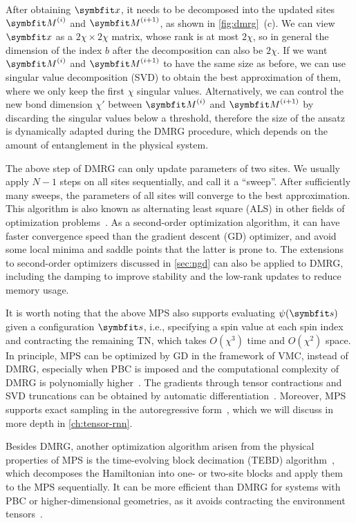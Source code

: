 After obtaining $\vx$, it needs to be decomposed into the updated sites $\mM^{(i)}$ and $\mM^{(i + 1)}$, as shown in \cref{fig:dmrg}~(c). We can view $\vx$ as a $2 \chi \times 2 \chi$ matrix, whose rank is at most $2 \chi$, so in general the dimension of the index $b$ after the decomposition can also be $2 \chi$. If we want $\mM^{(i)}$ and $\mM^{(i + 1)}$ to have the same size as before, we can use singular value decomposition (SVD) to obtain the best approximation of them, where we only keep the first $\chi$ singular values. Alternatively, we can control the new bond dimension $\chi'$ between $\mM^{(i)}$ and $\mM^{(i + 1)}$ by discarding the singular values below a threshold, therefore the size of the ansatz is dynamically adapted during the DMRG procedure, which depends on the amount of entanglement in the physical system.

The above step of DMRG can only update parameters of two sites. We usually apply $N - 1$ steps on all sites sequentially, and call it a ``sweep''. After sufficiently many sweeps, the parameters of all sites will converge to the best approximation. This algorithm is also known as alternating least square (ALS) in other fields of optimization problems~\cite{comon2009tensor, dolgov2015corrected}. As a second-order optimization algorithm, it can have faster convergence speed than the gradient descent (GD) optimizer, and avoid some local minima and saddle points that the latter is prone to. The extensions to second-order optimizers discussed in \cref{sec:ngd} can also be applied to DMRG, including the damping to improve stability and the low-rank updates to reduce memory usage.

It is worth noting that the above MPS also supports evaluating $\psi(\vs)$ given a configuration $\vs$, i.e., specifying a spin value at each spin index and contracting the remaining TN, which takes $O(\chi^3)$ time and $O(\chi^2)$ space. In principle, MPS can be optimized by GD in the framework of VMC, instead of DMRG, especially when PBC is imposed and the computational complexity of DMRG is polynomially higher~\cite{sandvik2007variational}. The gradients through tensor contractions and SVD truncations can be obtained by automatic differentiation~\cite{liu2017gradient, liao2019differentiable}. Moreover, MPS supports exact sampling in the autoregressive form~\cite{ferris2012perfect, han2018unsupervised, wei2022sequential}, which we will discuss in more depth in \cref{ch:tensor-rnn}.

Besides DMRG, another optimization algorithm arisen from the physical properties of MPS is the time-evolving block decimation (TEBD) algorithm~\cite{vidal2003efficient}, which decomposes the Hamiltonian into one- or two-site blocks and apply them to the MPS sequentially. It can be more efficient than DMRG for systems with PBC or higher-dimensional geometries, as it avoids contracting the environment tensors~\cite{jiang2008accurate}.

